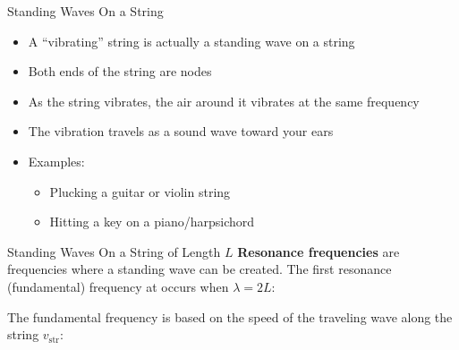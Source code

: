 \documentclass[12pt,aspectratio=169]{beamer}
\newcommand{\eq}[2]{\vspace{#1}{\Large\begin{displaymath}#2\end{displaymath}}}
\begin{document}
\begin{frame}{Standing Waves On a String}
  \begin{itemize}
  \item A ``vibrating'' string is actually a standing wave on a string
  \item Both ends of the string are nodes
  \item As the string vibrates, the air around it vibrates at the same frequency
  \item The vibration travels as a sound wave toward your ears
  \item Examples:
    \begin{itemize}
    \item Plucking a guitar or violin string
    \item Hitting a key on a piano/harpsichord
    \end{itemize}
  \end{itemize}
\end{frame}



\begin{frame}{Standing Waves On a String of Length $L$}
  \textbf{Resonance frequencies} are frequencies where a standing wave can be
  created. The first resonance (fundamental) frequency at occurs when
  $\lambda=2L$:
  \begin{center}
  \end{center}
  
  \vspace{-.1in}The fundamental frequency is based on the speed of the
  traveling wave along the string $v_\mathrm{str}$:

  \eq{-.3in}{
    \boxed{
      f_{r,1}
      =\frac{v_\mathrm{str}}{\lambda}=\frac{v_\mathrm{str}}{2L}}
  }
\end{frame}
\end{document}
